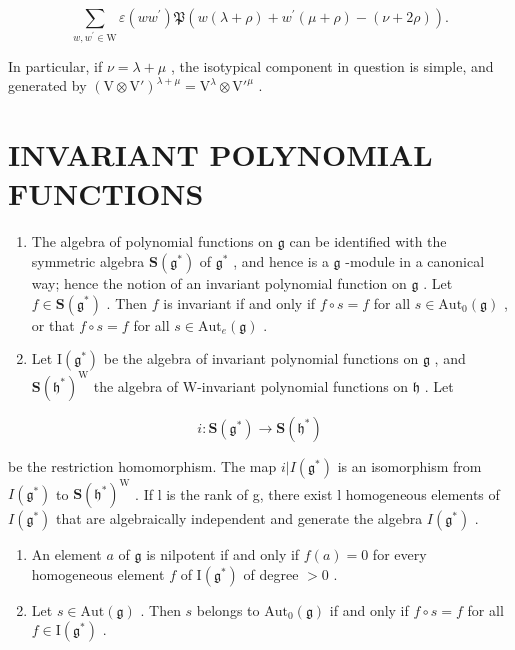 \[
\sum_ {w, w ^ {\prime} \in \mathrm{W}} \varepsilon (w w ^ {\prime}) \mathfrak {P} (w (\lambda + \rho) + w ^ {\prime} (\mu + \rho) - (\nu + 2 \rho)).
\]

In particular, if \(\nu = \lambda + \mu\) , the isotypical component in question is simple, and generated by \((\mathrm{V} \otimes \mathrm{V}')^{\lambda + \mu} = \mathrm{V}^{\lambda} \otimes \mathrm{V}'^{\mu}\) .

\section*{INVARIANT POLYNOMIAL FUNCTIONS}

\begin{enumerate}
\def\labelenumi{\arabic{enumi})}
\setcounter{enumi}{28}
\item
  The algebra of polynomial functions on \(\mathfrak{g}\) can be identified with the symmetric algebra \(\mathbf{S}(\mathfrak{g}^*)\) of \(\mathfrak{g}^*\) , and hence is a \(\mathfrak{g}\) -module in a canonical way; hence the notion of an invariant polynomial function on \(\mathfrak{g}\) . Let \(f \in \mathbf{S}(\mathfrak{g}^*)\) . Then \(f\) is invariant if and only if \(f \circ s = f\) for all \(s \in \mathrm{Aut}_0(\mathfrak{g})\) , or that \(f \circ s = f\) for all \(s \in \mathrm{Aut}_e(\mathfrak{g})\) .
\item
  Let \(\mathrm{I}(\mathfrak{g}^*)\) be the algebra of invariant polynomial functions on \(\mathfrak{g}\) , and \(\mathbf{S}(\mathfrak{h}^*)^{\mathrm{W}}\) the algebra of W-invariant polynomial functions on \(\mathfrak{h}\) . Let
\end{enumerate}

\[
i: \mathbf {S} (\mathfrak {g} ^ {*}) \to \mathbf {S} (\mathfrak {h} ^ {*})
\]

be the restriction homomorphism. The map \(i|I(\mathfrak{g}^{*})\) is an isomorphism from \(I(\mathfrak{g}^{*})\) to \(\mathbf{S}(\mathfrak{h}^{*})^{\mathrm{W}}\) . If l is the rank of g, there exist l homogeneous elements of \(I(\mathfrak{g}^{*})\) that are algebraically independent and generate the algebra \(I(\mathfrak{g}^{*})\) .

\begin{enumerate}
\def\labelenumi{\arabic{enumi})}
\setcounter{enumi}{30}
\item
  An element \(a\) of \(\mathfrak{g}\) is nilpotent if and only if \(f(a) = 0\) for every homogeneous element \(f\) of \(\mathrm{I}(\mathfrak{g}^*)\) of degree \(> 0\) .
\item
  Let \(s \in \mathrm{Aut}(\mathfrak{g})\) . Then \(s\) belongs to \(\mathrm{Aut}_0(\mathfrak{g})\) if and only if \(f \circ s = f\) for all \(f \in \mathrm{I}(\mathfrak{g}^*)\) .
\end{enumerate}

